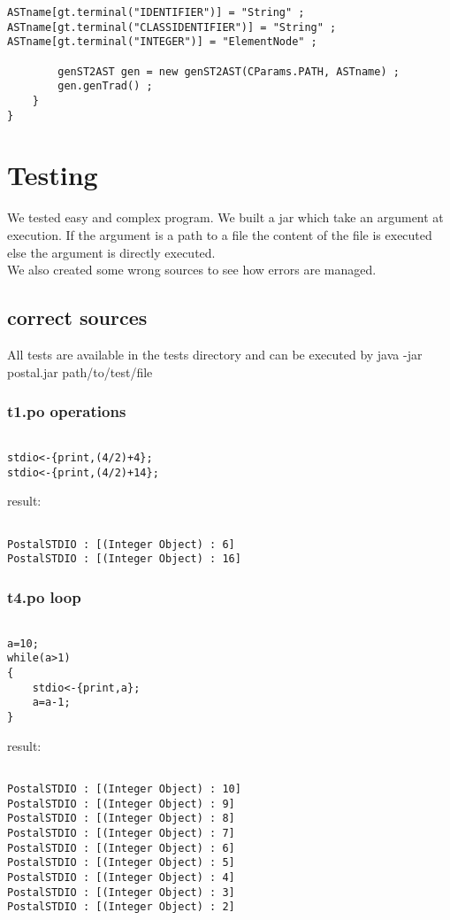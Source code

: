 \documentclass{eplDoc}
\begin{document}
\begin{lstlisting}
ASTname[gt.terminal("IDENTIFIER")] = "String" ;
ASTname[gt.terminal("CLASSIDENTIFIER")] = "String" ;
ASTname[gt.terminal("INTEGER")] = "ElementNode" ;
		
		genST2AST gen = new genST2AST(CParams.PATH, ASTname) ;
		gen.genTrad() ;
	}
}
\end{lstlisting}


\section{Testing}
We tested easy and complex program.  We built a jar which take an argument at execution.  If the argument is a path to a file the content of the file is executed else the argument is directly executed.\\
We also created some wrong sources to see how errors are managed.
\subsection{correct sources}
All tests are available in the tests directory and can be executed by java -jar postal.jar path/to/test/file
\subsubsection{t1.po operations}
\begin{lstlisting}
    
stdio<-{print,(4/2)+4};
stdio<-{print,(4/2)+14};
\end{lstlisting}
result:
\begin{lstlisting}
    
PostalSTDIO : [(Integer Object) : 6]
PostalSTDIO : [(Integer Object) : 16]
\end{lstlisting}

\subsubsection{t4.po loop}
\begin{lstlisting}
    
a=10;
while(a>1)
{
    stdio<-{print,a};
    a=a-1;
}
\end{lstlisting}
result:
\begin{lstlisting}
    
PostalSTDIO : [(Integer Object) : 10]
PostalSTDIO : [(Integer Object) : 9]
PostalSTDIO : [(Integer Object) : 8]
PostalSTDIO : [(Integer Object) : 7]
PostalSTDIO : [(Integer Object) : 6]
PostalSTDIO : [(Integer Object) : 5]
PostalSTDIO : [(Integer Object) : 4]
PostalSTDIO : [(Integer Object) : 3]
PostalSTDIO : [(Integer Object) : 2]
\end{lstlisting}
\end{document}
